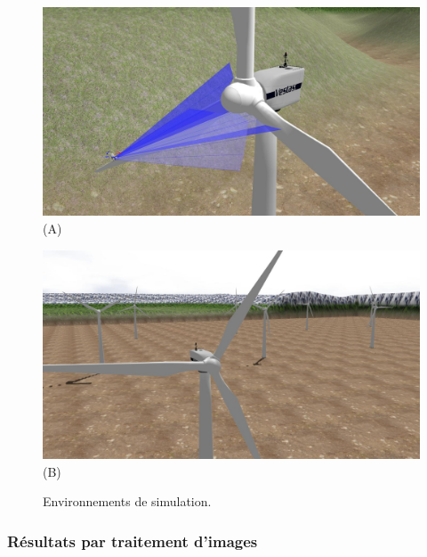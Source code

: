 \begin{figure}[htbp]
  \centering
  \begin{minipage}{0.49\textwidth}
    \centering
    \includegraphics[width=\linewidth]{images/sim_vestas_closeup.jpg}
    (A)
  \end{minipage}
  \begin{minipage}{0.49\textwidth}
    \centering
    \includegraphics[width=\linewidth]{images/sim_vestas_multiple.jpg}
    (B)
  \end{minipage}
  \caption{Environnements de simulation.}
  \label{fig:sim_worlds}
\end{figure}

\subsubsection{Résultats par traitement d'images}

